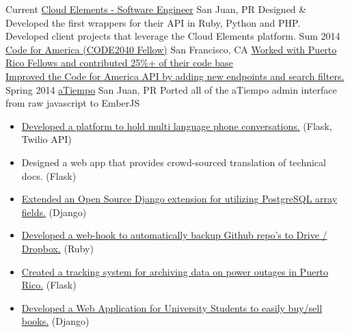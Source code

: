 \documentclass[]{friggeri-cv}
\begin{document}
\begin{entrylist}
\entry
{Current}
{\href{http://cloud-elements.com/}{Cloud Elements - Software Engineer}}
{San Juan, PR}
{Designed \& Developed the first wrappers for their API in Ruby, Python and PHP. \\
Developed client projects that leverage the Cloud Elements platform.}
\entry
{Sum 2014}
{\href{http://codeforamerica.org}{Code for America (CODE2040 Fellow)}}
{San Francisco, CA}
{\href{https://github.com/CoquiCoders/}{Worked with Puerto Rico Fellows and contributed 25\%+ of their code base} \\
\href{https://github.com/codeforamerica/cfapi}{Improved the Code for America API by adding new endpoints and search filters.}}
\entry
{Spring 2014}
{\href{http://atiempo.com/}{aTiempo}}
{San Juan, PR}
{Ported all of the aTiempo admin interface from raw javascript to EmberJS}
\end{entrylist}

\begin{itemize}
\item \href{https://github.com/chrisrodz/talk}{Developed a platform to hold multi language phone conversations.} (Flask, Twilio API)
\item Designed a web app that provides crowd-sourced translation of technical docs. (Flask)
\item \href{https://github.com/chrisrodz/djorm-ext-pgarray}{Extended an Open Source Django extension for utilizing PostgreSQL array fields.} (Django)
\item \href{https://github.com/chrisrodz/gh-backups}{Developed a web-hook to automatically backup Github repo's to Drive / Dropbox.} (Ruby)
\item \href{http://prepa-down.com/}{Created a tracking system for archiving data on power outages in Puerto Rico.} (Flask)
\item \href{https://github.com/chrisrodz/libros-online}{Developed a Web Application for University Students to easily buy/sell books.} (Django)
\end{itemize}

\end{document}
